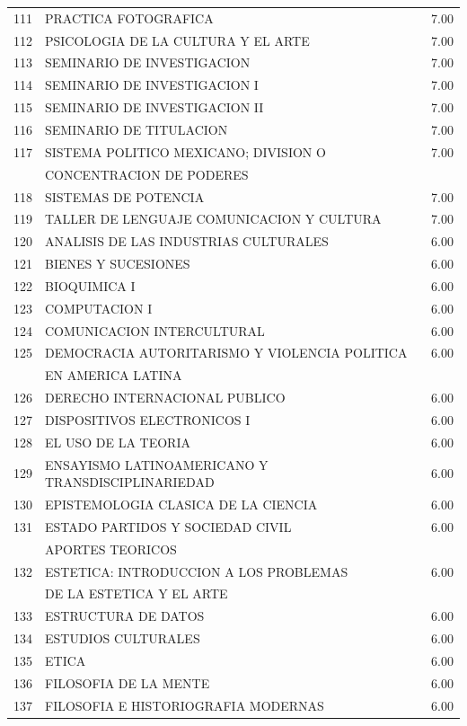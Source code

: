 \documentclass[12pt]{article}
\begin{document}
\begin{table}[ht]
{\begin{tabular}{rlr}
  111 & PRACTICA FOTOGRAFICA & 7.00 \\ 
  112 & PSICOLOGIA DE LA CULTURA Y EL ARTE & 7.00 \\ 
  113 & SEMINARIO DE INVESTIGACION & 7.00 \\ 
  114 & SEMINARIO DE INVESTIGACION I & 7.00 \\ 
  115 & SEMINARIO DE INVESTIGACION II & 7.00 \\ 
  116 & SEMINARIO DE TITULACION & 7.00 \\ 
  117 & SISTEMA POLITICO MEXICANO; DIVISION O & 7.00 \\ 
  &  CONCENTRACION DE PODERES &  \\ 
  118 & SISTEMAS DE POTENCIA & 7.00 \\ 
  119 & TALLER DE LENGUAJE COMUNICACION Y CULTURA & 7.00 \\ 
  120 & ANALISIS DE LAS INDUSTRIAS CULTURALES & 6.00 \\ 
  121 & BIENES Y SUCESIONES & 6.00 \\ 
  122 & BIOQUIMICA I & 6.00 \\ 
  123 & COMPUTACION I & 6.00 \\ 
  124 & COMUNICACION INTERCULTURAL & 6.00 \\ 
  125 & DEMOCRACIA AUTORITARISMO Y VIOLENCIA POLITICA & 6.00 \\ 
  & EN AMERICA LATINA &  \\ 
  126 & DERECHO INTERNACIONAL PUBLICO & 6.00 \\ 
  127 & DISPOSITIVOS ELECTRONICOS I & 6.00 \\ 
  128 & EL USO DE LA TEORIA & 6.00 \\ 
  129 & ENSAYISMO LATINOAMERICANO Y TRANSDISCIPLINARIEDAD & 6.00 \\ 
  130 & EPISTEMOLOGIA CLASICA DE LA CIENCIA & 6.00 \\ 
  131 & ESTADO PARTIDOS Y SOCIEDAD CIVIL & 6.00 \\ 
   &  APORTES TEORICOS &  \\ 
  132 & ESTETICA: INTRODUCCION A LOS PROBLEMAS  & 6.00 \\ 
   & DE LA ESTETICA Y EL ARTE & \\ 
  133 & ESTRUCTURA DE DATOS & 6.00 \\ 
  134 & ESTUDIOS CULTURALES & 6.00 \\ 
  135 & ETICA & 6.00 \\ 
  136 & FILOSOFIA DE LA MENTE & 6.00 \\ 
  137 & FILOSOFIA E HISTORIOGRAFIA MODERNAS & 6.00 \\ 

\end{tabular}}
\end{table}
\end{document}
